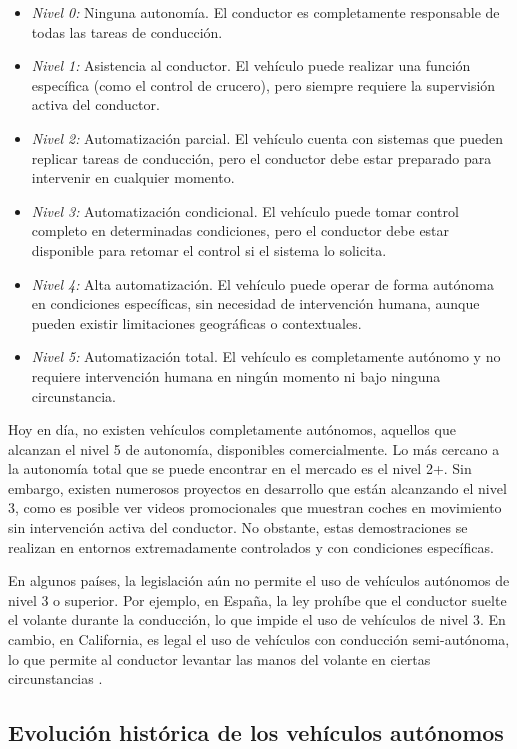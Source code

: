 \begin{itemize}
    \item \textit{Nivel 0:} Ninguna autonomía. El conductor es completamente responsable de todas las tareas de conducción.
    \item \textit{Nivel 1:} Asistencia al conductor. El vehículo puede realizar una función específica (como el control de crucero), pero siempre requiere la supervisión activa del conductor.
    \item \textit{Nivel 2:} Automatización parcial. El vehículo cuenta con sistemas que pueden replicar tareas de conducción, pero el conductor debe estar preparado para intervenir en cualquier momento.
    \item \textit{Nivel 3:} Automatización condicional. El vehículo puede tomar control completo en determinadas condiciones, pero el conductor debe estar disponible para retomar el control si el sistema lo solicita.
    \item \textit{Nivel 4:} Alta automatización. El vehículo puede operar de forma autónoma en condiciones específicas, sin necesidad de intervención humana, aunque pueden existir limitaciones geográficas o contextuales.
    \item \textit{Nivel 5:} Automatización total. El vehículo es completamente autónomo y no requiere intervención humana en ningún momento ni bajo ninguna circunstancia.
\end{itemize}

Hoy en día, no existen vehículos completamente autónomos, aquellos que alcanzan el nivel 5 de autonomía, disponibles comercialmente. Lo más cercano a la autonomía total que se puede encontrar en el mercado es el nivel 2+. Sin embargo, existen numerosos proyectos en desarrollo que están alcanzando el nivel 3, como es posible ver videos promocionales que muestran coches en movimiento sin intervención activa del conductor. No obstante, estas demostraciones se realizan en entornos extremadamente controlados y con condiciones específicas.

En algunos países, la legislación aún no permite el uso de vehículos autónomos de nivel 3 o superior. Por ejemplo, en España, la ley prohíbe que el conductor suelte el volante durante la conducción, lo que impide el uso de vehículos de nivel 3. En cambio, en California, es legal el uso de vehículos con conducción semi-autónoma, lo que permite al conductor levantar las manos del volante en ciertas circunstancias \cite{carwow-autonomous}. 

\subsection{Evolución histórica de los vehículos autónomos}
\label{sec:historia}

